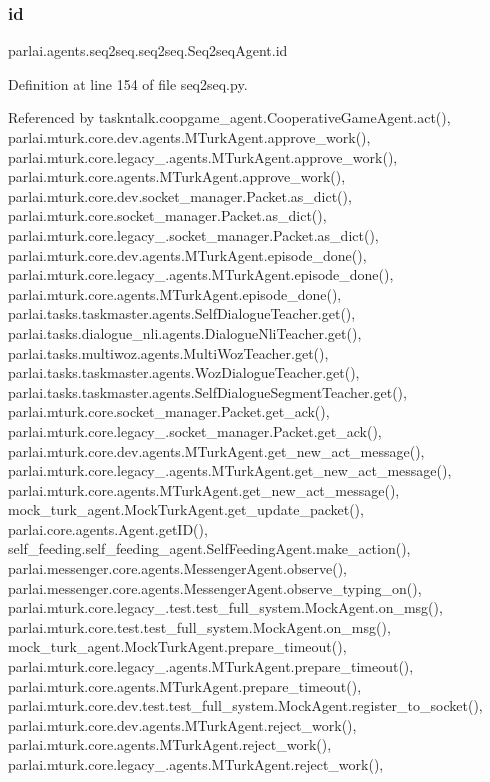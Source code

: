 \subsubsection{\texorpdfstring{id}{id}}
{\footnotesize\ttfamily parlai.\+agents.\+seq2seq.\+seq2seq.\+Seq2seq\+Agent.\+id}



Definition at line 154 of file seq2seq.\+py.



Referenced by taskntalk.\+coopgame\+\_\+agent.\+Cooperative\+Game\+Agent.\+act(), parlai.\+mturk.\+core.\+dev.\+agents.\+M\+Turk\+Agent.\+approve\+\_\+work(), parlai.\+mturk.\+core.\+legacy\+\_.\+agents.\+M\+Turk\+Agent.\+approve\+\_\+work(), parlai.\+mturk.\+core.\+agents.\+M\+Turk\+Agent.\+approve\+\_\+work(), parlai.\+mturk.\+core.\+dev.\+socket\+\_\+manager.\+Packet.\+as\+\_\+dict(), parlai.\+mturk.\+core.\+socket\+\_\+manager.\+Packet.\+as\+\_\+dict(), parlai.\+mturk.\+core.\+legacy\+\_.\+socket\+\_\+manager.\+Packet.\+as\+\_\+dict(), parlai.\+mturk.\+core.\+dev.\+agents.\+M\+Turk\+Agent.\+episode\+\_\+done(), parlai.\+mturk.\+core.\+legacy\+\_.\+agents.\+M\+Turk\+Agent.\+episode\+\_\+done(), parlai.\+mturk.\+core.\+agents.\+M\+Turk\+Agent.\+episode\+\_\+done(), parlai.\+tasks.\+taskmaster.\+agents.\+Self\+Dialogue\+Teacher.\+get(), parlai.\+tasks.\+dialogue\+\_\+nli.\+agents.\+Dialogue\+Nli\+Teacher.\+get(), parlai.\+tasks.\+multiwoz.\+agents.\+Multi\+Woz\+Teacher.\+get(), parlai.\+tasks.\+taskmaster.\+agents.\+Woz\+Dialogue\+Teacher.\+get(), parlai.\+tasks.\+taskmaster.\+agents.\+Self\+Dialogue\+Segment\+Teacher.\+get(), parlai.\+mturk.\+core.\+socket\+\_\+manager.\+Packet.\+get\+\_\+ack(), parlai.\+mturk.\+core.\+legacy\+\_.\+socket\+\_\+manager.\+Packet.\+get\+\_\+ack(), parlai.\+mturk.\+core.\+dev.\+agents.\+M\+Turk\+Agent.\+get\+\_\+new\+\_\+act\+\_\+message(), parlai.\+mturk.\+core.\+legacy\+\_.\+agents.\+M\+Turk\+Agent.\+get\+\_\+new\+\_\+act\+\_\+message(), parlai.\+mturk.\+core.\+agents.\+M\+Turk\+Agent.\+get\+\_\+new\+\_\+act\+\_\+message(), mock\+\_\+turk\+\_\+agent.\+Mock\+Turk\+Agent.\+get\+\_\+update\+\_\+packet(), parlai.\+core.\+agents.\+Agent.\+get\+I\+D(), self\+\_\+feeding.\+self\+\_\+feeding\+\_\+agent.\+Self\+Feeding\+Agent.\+make\+\_\+action(), parlai.\+messenger.\+core.\+agents.\+Messenger\+Agent.\+observe(), parlai.\+messenger.\+core.\+agents.\+Messenger\+Agent.\+observe\+\_\+typing\+\_\+on(), parlai.\+mturk.\+core.\+legacy\+\_.\+test.\+test\+\_\+full\+\_\+system.\+Mock\+Agent.\+on\+\_\+msg(), parlai.\+mturk.\+core.\+test.\+test\+\_\+full\+\_\+system.\+Mock\+Agent.\+on\+\_\+msg(), mock\+\_\+turk\+\_\+agent.\+Mock\+Turk\+Agent.\+prepare\+\_\+timeout(), parlai.\+mturk.\+core.\+legacy\+\_.\+agents.\+M\+Turk\+Agent.\+prepare\+\_\+timeout(), parlai.\+mturk.\+core.\+agents.\+M\+Turk\+Agent.\+prepare\+\_\+timeout(), parlai.\+mturk.\+core.\+dev.\+test.\+test\+\_\+full\+\_\+system.\+Mock\+Agent.\+register\+\_\+to\+\_\+socket(), parlai.\+mturk.\+core.\+dev.\+agents.\+M\+Turk\+Agent.\+reject\+\_\+work(), parlai.\+mturk.\+core.\+agents.\+M\+Turk\+Agent.\+reject\+\_\+work(), parlai.\+mturk.\+core.\+legacy\+\_.\+agents.\+M\+Turk\+Agent.\+reject\+\_\+work(), 